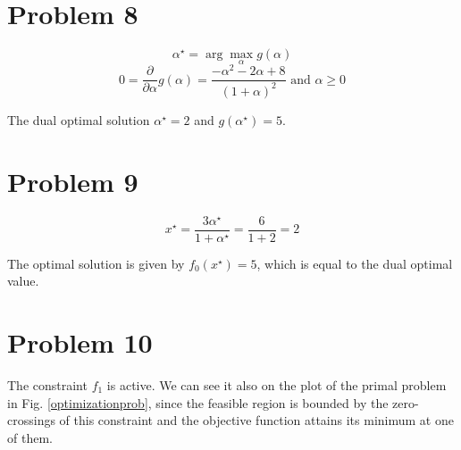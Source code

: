 \documentclass[12pt]{article}
\begin{document}
\section*{Problem 8}

\begin{equation}
 \alpha^\star = \arg \max_\alpha g(\alpha) 
\end{equation}
\begin{equation}
 0 = \frac{\partial}{\partial \alpha} g(\alpha) = \frac{- \alpha^2 - 2 \alpha +8}{(1 + \alpha)^2} \text{ and } \alpha \geq 0
\end{equation}

The dual optimal solution $\alpha^\star = 2$ and $g(\alpha^\star) = 5$.

\section*{Problem 9}

\begin{equation}
 x^\star = \frac{3 \alpha^\star}{1 + \alpha^\star} = \frac{6}{1 + 2} = 2
\end{equation}

The optimal solution is given by $f_0(x^\star) = 5$, which is equal to the dual optimal value.

\section*{Problem 10}

The constraint $f_1$ is active. We can see it also on the plot of the primal problem in Fig. \ref{optimizationprob}, since the feasible region is bounded by the zero-crossings of this constraint and the objective function attains its minimum at one of them.

  
\end{document}
